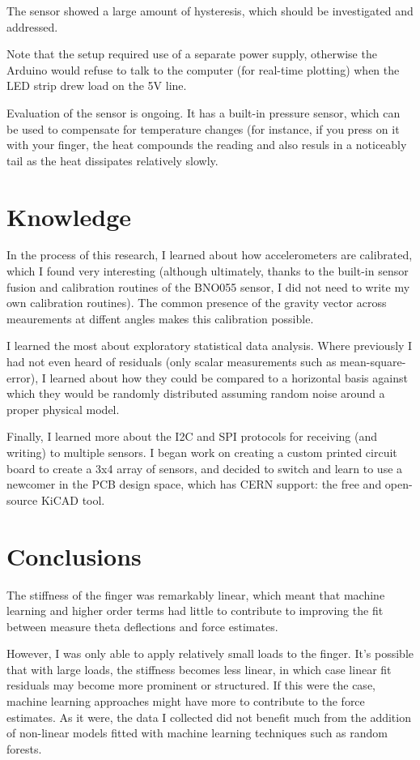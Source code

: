 \documentclass[preprint,12pt,3p]{elsarticle}
\begin{document}
The sensor showed a large amount of hysteresis, which should be investigated and addressed.

Note that the setup required use of a separate power supply, otherwise the Arduino would refuse to talk to the
computer (for real-time plotting) when the LED strip drew load on the 5V line.

Evaluation of the sensor is ongoing. It has a built-in pressure sensor, which
can be used to compensate for temperature changes (for instance, if you press on
it with your finger, the heat compounds the reading and also resuls in a
noticeably tail as the heat dissipates relatively slowly.

\section{Knowledge}

In the process of this research, I learned about how accelerometers are calibrated, which I found
very interesting (although ultimately, thanks to the built-in sensor fusion and calibration routines of the BNO055
sensor, I did not need to write my own calibration routines). The common presence of the gravity
vector across meaurements at diffent angles makes this calibration possible.

I learned the most about exploratory statistical data analysis. Where previously I had not even
heard of residuals (only scalar measurements such as mean-square-error), I learned about how they
could be compared to a horizontal basis against which they would be randomly distributed assuming
random noise around a proper physical model.

Finally, I learned more about the I2C and SPI protocols for receiving (and writing) to multiple
sensors. I began work on creating a custom printed circuit board to create a 3x4 array of sensors,
and decided to switch and learn to use a newcomer in the PCB design space, which has CERN support: the free and open-source
KiCAD tool.

\section{Conclusions}

The stiffness of the finger was remarkably linear, which meant that machine learning and higher
order terms had little to contribute to improving the fit between measure theta deflections and
force estimates.

However, I was only able to apply relatively small loads to the finger. It's possible that with
large loads, the stiffness becomes less linear, in which case linear fit residuals may become more
prominent or structured. If this were the case, machine learning approaches might have more to
contribute to the force estimates. As it were, the data I collected did not benefit much from the
addition of non-linear models fitted with machine learning techniques such as random forests.
\end{document}
